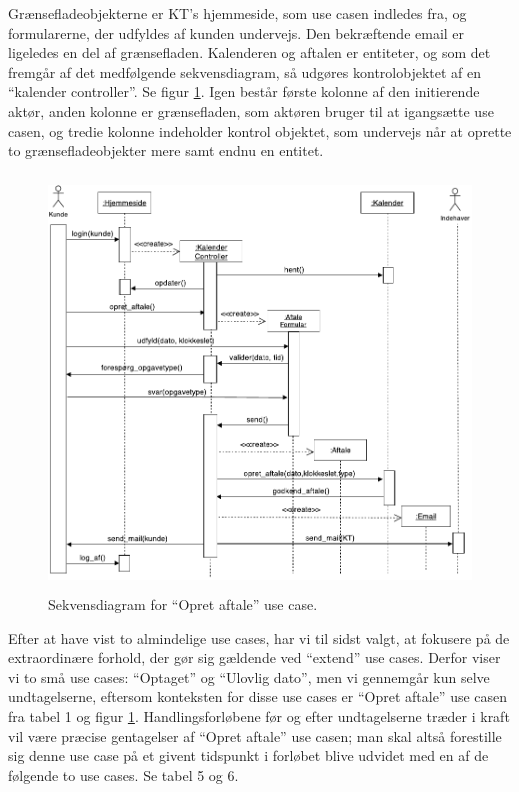 \documentclass[12pt]{article}   %
\begin{document}
Grænsefladeobjekterne er KT's hjemmeside, som use casen indledes fra, og
formularerne, der udfyldes af kunden undervejs. Den bekræftende email er
ligeledes en del af grænsefladen. Kalenderen og aftalen er entiteter, og som
det fremgår af det medfølgende sekvensdiagram, så udgøres kontrolobjektet af en
``kalender controller''. Se figur \ref{fig:aft}. 
Igen består første kolonne af den initierende aktør, anden kolonne er
grænsefladen, som aktøren bruger til at igangsætte use casen, og tredie
kolonne indeholder kontrol objektet, som undervejs når at oprette to
grænsefladeobjekter mere samt endnu en entitet.

\begin{figure}[!ht]
\includegraphics[width=14cm, height=11cm]{seq.pdf}
\caption{Sekvensdiagram for ``Opret aftale'' use case.}
\label{fig:aft}
\end{figure}

Efter at have vist to almindelige use cases, har vi til sidst valgt, 
at fokusere på de extraordinære forhold, der gør sig gældende ved ``extend''
use cases. Derfor viser vi to små use cases: ``Optaget'' og ``Ulovlig
dato'', men vi gennemgår kun selve undtagelserne, eftersom konteksten for
disse use cases er ``Opret aftale'' use casen fra tabel
1 og figur \ref{fig:aft}. Handlingsforløbene før og efter undtagelserne træder i
kraft vil være præcise gentagelser af ``Opret aftale'' use casen; man skal
altså forestille sig denne use case på et givent tidspunkt i forløbet
blive udvidet med en af de følgende to use cases. Se tabel 5 og 6.\\ 
\end{document}
